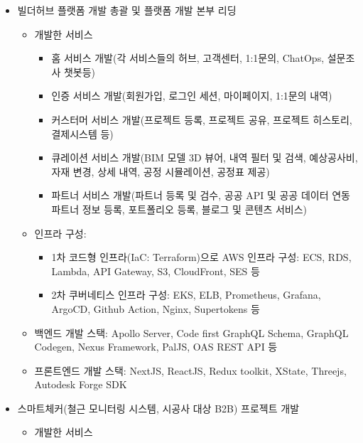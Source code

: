 \documentclass[10pt,a4paper,ragged2e]{altacv}
\begin{document}
\begin{fullwidth}

	\begin{itemize}
		\item 빌더허브 플랫폼 개발 총괄 및 플랫폼 개발 본부 리딩
		  \begin{itemize}[label=$\star$]
			  \item 개발한 서비스
			    \begin{itemize}
				    \item 홈 서비스 개발(각 서비스들의 허브, 고객센터, 1:1문의, ChatOps, 설문조사 챗봇등)
				    \item 인증 서비스 개발(회원가입, 로그인 세션, 마이페이지, 1:1문의 내역)
				    \item 커스터머 서비스 개발(프로젝트 등록, 프로젝트 공유, 프로젝트 히스토리, 결제시스템 등)
				    \item 큐레이션 서비스 개발(BIM 모델 3D 뷰어, 내역 필터 및 검색, 예상공사비, 자재 변경, 상세 내역, 공정 시뮬레이션, 공정표 제공)
				    \item 파트너 서비스 개발(파트너 등록 및 검수, 공공 API 및 공공 데이터 연동 파트너 정보 등록, 포트폴리오 등록, 블로그 및 콘텐츠 서비스)
			    \end{itemize}
			  \item 인프라 구성:
			    \begin{itemize}
				    \item 1차 코드형 인프라(IaC: Terraform)으로 AWS 인프라 구성: ECS, RDS, Lambda, API Gateway, S3, CloudFront, SES 등
				    \item 2차 쿠버네티스 인프라 구성: EKS, ELB, Prometheus, Grafana, ArgoCD, Github Action, Nginx, Supertokens 등
			    \end{itemize}
			  \item 백엔드 개발 스택: Apollo Server, Code first GraphQL Schema, GraphQL Codegen, Nexus Framework, PalJS, OAS REST API 등
			  \item 프론트엔드 개발 스택: NextJS, ReactJS, Redux toolkit, XState, Threejs, Autodesk Forge SDK
		  \end{itemize}
		\item 스마트체커(철근 모니터링 시스템, 시공사 대상 B2B) 프로젝트 개발
    \begin{itemize}[label=$\star$]
      \item 개발한 서비스
        \begin{itemize}

\end{itemize}
\end{itemize}
\end{itemize}
\end{fullwidth}
\end{document}
